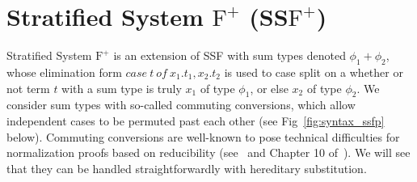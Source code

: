 \newcommand{\ccon}[4]{\mbox{case}\ #1\ \text{of}\ #2\text{.}#3\text{,}#2\text{.}#4}
\newcommand{\rcase}[5]{\mbox{rcase}_{#1}\ #2\ #3\ #4\ #5}
\newcommand{\F}[0]{\mbox{F}^{=}}
\newcommand{\Fp}[0]{\mbox{F}^{+}}
\newcommand{\STLCeq}[0]{\textnormal{STLC}^=}
\newcommand{\A}[0]{\mbox{\textbf{A}}}
\newcommand{\bredto}[0]{\rightsquigarrow_\beta}
\newcommand{\hlmn}[2]{
  \marginpar{
    \small
    {\color{blue}{
        \tiny #2
    }}}
    {\color{red}{
        #1
    }}
}

\section{Stratified System $\Fp$ (SS$\Fp$)}
\label{sec:stratified_system_f_with_sum_types}
Stratified System $\Fp$ is an extension of SSF with sum types denoted
$\phi_1 + \phi_2$, whose elimination form $\textit{case}\ t\
\textit{of}\ x_1.t_1,x_2.t_2$ is used to case split on a whether or
not term $t$ with a sum type is truly $x_1$ of type $\phi_1$, or else
$x_2$ of type $\phi_2$.  We consider sum types with so-called
commuting conversions, which allow independent cases to be permuted
past each other (see Fig~\ref{fig:syntax_ssfp} below).  Commuting
conversions are well-known to pose technical difficulties for
normalization proofs based on reducibility (see~\cite{tatsuta+05} and
Chapter 10 of~\cite{Girard:1989}).  We will see that they can be
handled straightforwardly with hereditary substitution.

